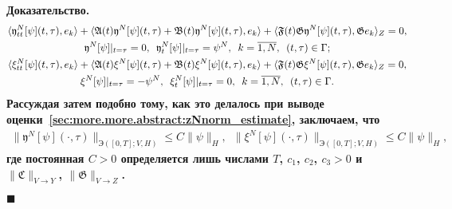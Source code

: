 \documentclass{report}
\newenvironment{Proof}{\par\noindent\bf Доказательство.\rm}{ $\blacksquare$\par}
\begin{document}
\begin{Proof}
\begin{gather}
\label{thetaN_identity:nonaut:parametric}
\langle\mathfrak{y}^{N}_{tt}[\psi](t,\tau),e_k\rangle + \langle\mathfrak{A}(t)\mathfrak{y}^{N}[\psi](t,\tau)+\mathfrak{B}(t)\mathfrak{y}^{N}[\psi](t,\tau),e_k\rangle+\langle\mathfrak{F}(t) \mathfrak{G}\mathfrak{y}^{N}[\psi](t,\tau), \mathfrak{G}e_k\rangle_Z=0,\\
\notag\mathfrak{y}^{N}[\psi]|_{t=\tau}=0,\,\,\,\mathfrak{y}^{N}_t[\psi]|_{t=\tau}=\psi^{N},\,\,\,k=\overline{1,N},\,\,\,(t,\tau)\in\Gamma;\\
\label{xiN_identity:nonaut:parametric}
\langle\xi^{N}_{tt}[\psi](t,\tau),e_k\rangle + \langle\mathfrak{A}(t)\xi^N[\psi](t,\tau)+\mathfrak{B}(t)\xi^{N}[\psi](t,\tau),e_k\rangle+\langle\mathfrak{F}(t) \mathfrak{G}\xi^{N}[\psi](t,\tau), \mathfrak{G}e_k\rangle_Z=0,\\
\notag\xi^N[\psi]|_{t=\tau}=-\psi^N,\,\,\,\xi^N_t[\psi]|_{t=\tau}=0,\,\,\,k=\overline{1,N},\,\,\,(t,\tau)\in\Gamma.
\end{gather}
Рассуждая затем подобно тому, как это делалось при выводе оценки~\eqref{sec:more.more.abstract:zNnorm_estimate}, заключаем, что
\begin{gather*}
\|\mathfrak{y}^{N}[\psi](\cdot,\tau)\|_{\textrm{Э}([0,T]; V,H)}\leqslant C\|\psi\|_H,\,\,\,
\|\xi^N[\psi](\cdot,\tau)\|_{\textrm{Э}([0,T]; V,H)}\leqslant C\|\psi\|_H,
\end{gather*}
где постоянная $C>0$ определяется лишь числами $T$, $c_1$, $c_2$, $c_3>0$ и $\|\mathfrak{C}\|_{V\to Y}$,  $\|\mathfrak{G}\|_{V\to Z}$.


\end{Proof}
\end{document}
